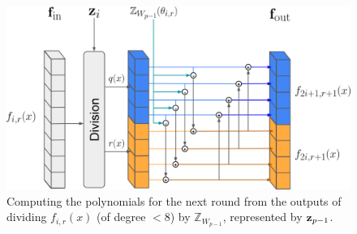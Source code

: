 \begin{figure}[tbh]
	\centering
	\includegraphics[width=0.75\linewidth]{Figures/Division.jpg}
	\caption{Computing the polynomials for the next round from the outputs of dividing \( f_{i,r}(x) \) (of degree \( < 8 \)) by \( \mathbb{Z}_{W_{p-1}} \), represented by \( {\bf{z}}_{p-1} \). %
	}  
	\label{fig:division}
\end{figure}

